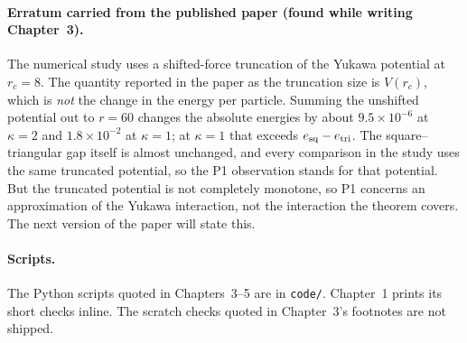 \paragraph{Erratum carried from the published paper (found while writing Chapter~3).} The numerical study uses a
shifted-force truncation of the Yukawa potential at $r_c=8$. The quantity reported in the paper as the truncation size
is $V(r_c)$, which is \emph{not} the change in the energy per particle. Summing the unshifted potential out to $r=60$
changes the absolute energies by about $9.5\times10^{-6}$ at $\kappa=2$ and $1.8\times10^{-2}$ at $\kappa=1$; at
$\kappa=1$ that exceeds $e_{\rm sq}-e_{\rm tri}$. The square--triangular gap itself is almost unchanged, and every
comparison in the study uses the same truncated potential, so the P1 observation stands for that potential. But the
truncated potential is not completely monotone, so P1 concerns an approximation of the Yukawa interaction, not the
interaction the theorem covers. The next version of the paper will state this.

\paragraph{Scripts.} The Python scripts quoted in Chapters~3--5 are in \texttt{code/}. Chapter~1 prints its short
checks inline. The scratch checks quoted in Chapter~3's footnotes are not shipped.
